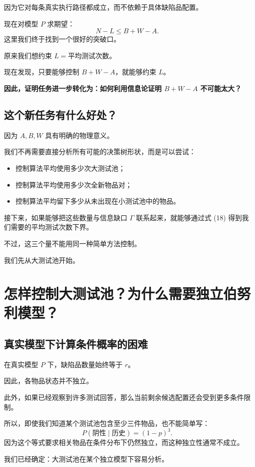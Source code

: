 \documentclass[UTF8,11pt]{ctexart}
\begin{document}
因为它对每条真实执行路径都成立，而不依赖于具体缺陷品配置。

现在对模型 $P$ 求期望：
\begin{equation}\boxed{N-L\le B+W-A.}\tag{18}\end{equation}
这里我们终于找到一个很好的突破口。

原来我们想约束 $L=\text{平均测试次数}$。

现在发现，只要能够控制 $B+W-A$，就能够约束 $L$。

\textbf{因此，证明任务进一步转化为：如何利用信息论证明 $B+W-A$ 不可能太大？}

\subsection{这个新任务有什么好处？}
因为 $A,B,W$ 具有明确的物理意义。

我们不再需要直接分析所有可能的决策树形状，而是可以尝试：
\begin{itemize}
\item 控制算法平均使用多少次大测试池；
\item 控制算法平均使用多少次全新物品对；
\item 控制算法平均留下多少从未出现在小测试池中的物品。
\end{itemize}
接下来，如果能够把这些数量与信息缺口 $\Gamma$ 联系起来，就能够通过式 (18) 得到我们需要的平均测试次数下界。

不过，这三个量不能用同一种简单方法控制。

我们先从大测试池开始。

\section{怎样控制大测试池？为什么需要独立伯努利模型？}
\subsection{真实模型下计算条件概率的困难}
在真实模型 $P$ 下，缺陷品数量始终等于 $r$。

因此，各物品状态并不独立。

此外，如果已经观察到许多测试回答，那么当前剩余候选配置还会受到更多条件限制。

所以，即使我们知道某个测试池包含至少三件物品，也不能简单写：
\[P(\text{阴性}\mid\text{历史})=(1-p)^3.\]
因为这个等式要求相关物品在条件分布下仍然独立，而这种独立性通常不成立。

我们已经确定：大测试池在某个独立模型下容易分析。
\end{document}
